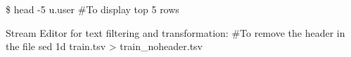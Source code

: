 \$ head -5 u.user #To display top 5 rows

Stream Editor for text filtering and transformation:
#To remove the header in the file
sed 1d train.tsv > train_noheader.tsv

